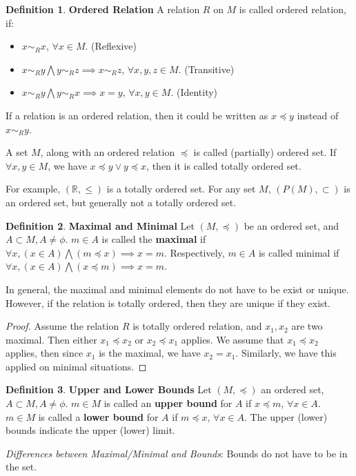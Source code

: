 \documentclass{article}
\theoremstyle{definition}
\newtheorem{defi}{Definition}[section]
\begin{document}
\begin{defi}
\textbf{Ordered Relation} A relation $R$ on $M$ is called ordered relation, if: 
\begin{itemize}
    \item $x \sim_{R} x$, $\forall x \in M$. (Reflexive)
    \item $x \sim_{R} y \bigwedge y \sim_{R} z \implies x \sim_{R} z$, $\forall x, y, z \in M$. (Transitive)
    \item $x \sim_{R} y \bigwedge y \sim_{R} x \implies x = y$, $\forall x, y \in M$. (Identity)
\end{itemize}

If a relation is an ordered relation, then it could be written as $x \preceq y$ instead of $x \sim_{R} y$.

A set $M$, along with an ordered relation $\preceq$ is called (partially) ordered set. If $\forall x,y \in M$, we have $x \preceq y \lor y \preceq x$, then it is called totally ordered set.

For example, $(\mathbb{R},\leq)$ is a totally ordered set. For any set $M$, $(P(M), \subset)$ is an ordered set, but generally not a totally ordered set.

\end{defi}

\begin{defi}
\textbf{Maximal and Minimal} Let $(M, \preceq)$ be an ordered set, and $A \subset M, A \neq \phi$. $m\in A$ is called the \textbf{maximal} if $\forall x, (x \in A)\bigwedge(m\preceq x) \implies x = m$. Respectively, $m\in A$ is called minimal if $\forall x, (x \in A)\bigwedge(x\preceq m) \implies x = m$.

In general, the maximal and minimal elements do not have to be exist or unique. However, if the relation is totally ordered, then they are unique if they exist.

\begin{proof}

Assume the relation $R$ is totally ordered relation, and $x_1, x_2$ are two maximal. Then either $x_{1} \preceq x_{2}$ or $x_{2} \preceq x_{1}$ applies. We assume that $x_{1} \preceq x_{2}$ applies, then since $x_{1}$ is the maximal, we have $x_{2}=x_{1}$. Similarly, we have this applied on minimal situations. 
\end{proof}
\end{defi}

\begin{defi}
\textbf{Upper and Lower Bounds} Let $(M, \preceq)$ an ordered set, $A \subset M, A \neq \phi$. $m \in M$ is called an \textbf{upper bound} for $A$ if $x \preceq m$, $\forall x\in A$. $m \in M$ is called a \textbf{lower bound} for $A$ if $m \preceq x$, $\forall x \in A$. The upper (lower) bounds indicate the upper (lower) limit.

\textit{Differences between Maximal/Minimal and Bounds}: Bounds do not have to be in the set.

\end{defi}
\end{document}
